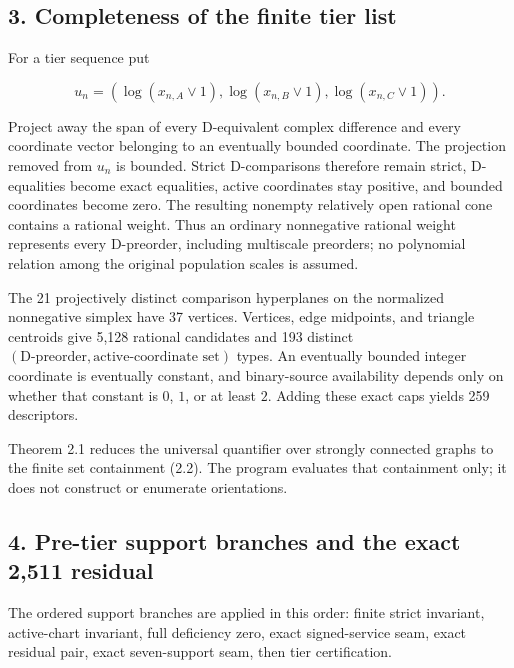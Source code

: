 \subsection{3. Completeness of the finite tier
list}

For a tier sequence put

\[
 u_n=(\log(x_{n,A}\vee1),\log(x_{n,B}\vee1),
      \log(x_{n,C}\vee1)).
\]

Project away the span of every D-equivalent complex difference and every
coordinate vector belonging to an eventually bounded coordinate. The
projection removed from \(u_n\) is bounded. Strict D-comparisons
therefore remain strict, D-equalities become exact equalities, active
coordinates stay positive, and bounded coordinates become zero. The
resulting nonempty relatively open rational cone contains a rational
weight. Thus an ordinary nonnegative rational weight represents every
D-preorder, including multiscale preorders; no polynomial relation among
the original population scales is assumed.

The 21 projectively distinct comparison hyperplanes on the normalized
nonnegative simplex have 37 vertices. Vertices, edge midpoints, and
triangle centroids give 5,128 rational candidates and 193 distinct
\((\text{D-preorder},\text{active-coordinate set})\) types. An
eventually bounded integer coordinate is eventually constant, and
binary-source availability depends only on whether that constant is
\(0\), \(1\), or at least \(2\). Adding these exact caps yields 259
descriptors.

Theorem 2.1 reduces the universal quantifier over strongly connected
graphs to the finite set containment (2.2). The program evaluates that
containment only; it does not construct or enumerate orientations.

\subsection{4. Pre-tier support branches and the exact 2,511
residual}

The ordered support branches are applied in this order: finite strict
invariant, active-chart invariant, full deficiency zero, exact
signed-service seam, exact residual pair, exact seven-support seam, then
tier certification.


